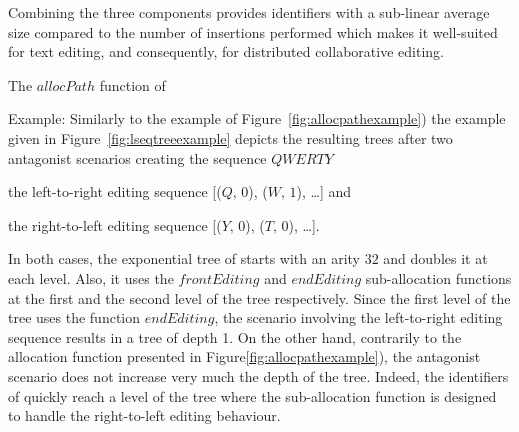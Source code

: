 \begin{asparadesc}
  Combining the three components provides identifiers with a sub-linear average
  size compared to the number of insertions performed which makes it well-suited
  for text editing, and consequently, for distributed collaborative editing.
\end{asparadesc}

\begin{algorithm}[h]

\caption{The $allocPath$ function of \LSEQ}
\label{algo:allocpathalgo}
\end{algorithm}

\begin{asparadesc}
\item[Example:] Similarly to the example of Figure~\ref{fig:allocpathexample})
   the example given in Figure~\ref{fig:lseqtreeexample} depicts the resulting
   trees after two antagonist scenarios creating the sequence
   $QWERTY$ \begin{inparaenum}[(i)] \item the left-to-right editing sequence
     [($Q,\,0$), ($W,\,1$), \ldots] and \item the right-to-left editing sequence
     [($Y,\,0$), ($T,\,0$), \ldots]. \end{inparaenum} In both cases, the
   exponential tree of \LSEQ starts with an arity $32$ and doubles it at each
   level. Also, it uses the $frontEditing$ and $endEditing$ sub-allocation
   functions at the first and the second level of the tree respectively. Since
   the first level of the tree uses the function $endEditing$, the scenario
   involving the left-to-right editing sequence results in a tree of depth 1. On
   the other hand, contrarily to the allocation function presented in
   Figure\ref{fig:allocpathexample}), the antagonist scenario does not increase
   very much the depth of the tree. Indeed, the identifiers of \LSEQ quickly
   reach a level of the tree where the sub-allocation function is designed to
   handle the right-to-left editing behaviour.
\end{asparadesc}


